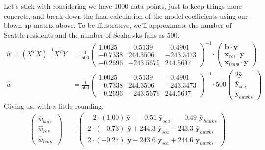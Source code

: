 Let's stick with considering we have 1000 data points, just to keep things more
concrete, and break down the final calculation of the model coefficients using
our blown up matrix above. To be illustrative, we'll approximate the number of
Seattle residents and the number of Seahawks fans as 500.
\begin{align}
\hat{w} = 
(X^T X)^{-1} X^T Y &=
\frac{1}{500}
\left(\begin{array}{ccc}
          1.0025 &   -0.5139  &   -0.4901 \\
         -0.7338 &  244.3506  & -243.3473 \\
         -0.2696 & -243.5679  &  244.5697
\end{array}\right)^{-1}
\cdot 
\left(\begin{array}{r}
          \mathbf{b} \cdot \mathbf{y} \\
          \mathbf{x}_\mathit{res} \cdot \mathbf{y} \\
          \mathbf{x}_\mathit{team} \cdot \mathbf{y}  
\end{array}\right)
\\
\hat{w} &= 
\frac{1}{500}
\left(\begin{array}{ccc}
          1.0025 &   -0.5139  &   -0.4901 \\
         -0.7338 &  244.3506  & -243.3473 \\
         -0.2696 & -243.5679  &  244.5697
\end{array}\right)^{-1}
\cdot 
500
\left(\begin{array}{l}
          2 \mathbf{\bar{y}} \\
          \mathbf{\bar{y}}_\mathit{sea} \\
          \mathbf{\bar{y}}_\mathit{hawks}
\end{array}\right)
\end{align}
Giving us, with a little rounding,
\begin{align}
\left(\begin{array}{l}
          \hat{w}_\mathit{bias} \\
          \hat{w}_\mathit{res} \\
          \hat{w}_\mathit{team} 
\end{array}\right)
&=
\left(\begin{array}{l}
          \quad 2 \cdot (1.00)  \, \mathbf{\bar{y}}
                 - \;\;\; 0.51 \,\, \mathbf{\bar{y}}_\mathit{sea} 
                 - \;\;\; 0.49 \,\, \mathbf{\bar{y}}_\mathit{hawks} \\
          \ 2 \cdot (-0.73) \,\, \mathbf{\bar{y}} 
              + 244.3  \,\, \mathbf{\bar{y}}_\mathit{sea} 
              - 243.3  \,\, \mathbf{\bar{y}}_\mathit{hawks} \\
          \ 2 \cdot (-0.27) \,\, \mathbf{\bar{y}} 
              - 243.6  \,\, \mathbf{\bar{y}}_\mathit{sea} 
              + 244.6  \,\, \mathbf{\bar{y}}_\mathit{hawks}
\end{array}\right)
\end{align}
